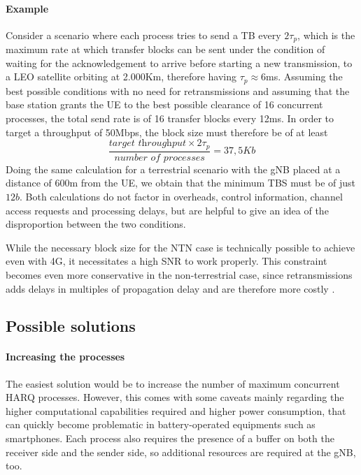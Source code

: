 \paragraph{Example} Consider a scenario where each process tries to send a \ac{TB} every $2\tau_p$, which is the maximum rate at which transfer blocks can be sent under the condition of waiting for the acknowledgement to arrive before starting a new transmission, to a \ac{LEO} satellite orbiting at 2.000Km, therefore having $\tau_p\approx6$ms. Assuming the best possible conditions with no need for retransmissions and assuming that the base station grants the \ac{UE} to the best possible clearance of 16 concurrent processes, the total send rate is of 16 transfer blocks every 12ms. In order to target a throughput of 50Mbps, the block size must therefore be of at least $$\frac{\textit{target throughput} \times 2\tau_p}{\textit{number of processes}} = 37,5Kb$$
Doing the same calculation for a terrestrial scenario with the \ac{gNB} placed at a distance of 600m from the \ac{UE}, we obtain that the minimum \ac{TBS} must be of just $12b$.
Both calculations do not factor in overheads, control information, channel access requests and processing delays, but are helpful to give an idea of the disproportion between the two conditions.

While the necessary block size for the \ac{NTN} case is technically possible to achieve even with 4G, it necessitates a high \ac{SNR} to work properly. This constraint becomes even more conservative in the non-terrestrial case, since retransmissions adds delays in multiples of propagation delay and are therefore more costly \cite{4g-phy-processing-sharetechnote}.

\subsection{Possible solutions}
\paragraph{Increasing the processes}
The easiest solution would be to increase the number of maximum concurrent \ac{HARQ} processes. However, this comes with some caveats mainly regarding the higher computational capabilities required and higher power consumption, that can quickly become problematic in battery-operated equipments such as smartphones. Each process also requires the presence of a buffer on both the receiver side and the sender side, so additional resources are required at the \ac{gNB}, too. 
